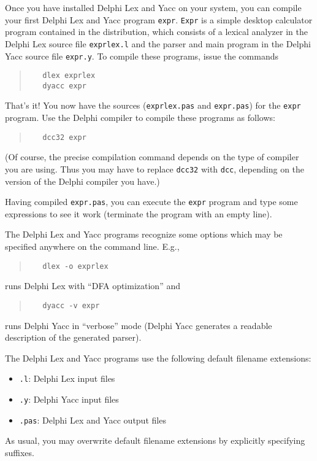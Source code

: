 \documentclass[a4paper]{article}
\begin{document}
Once you have installed Delphi Lex and Yacc on your system, you can compile your
first Delphi Lex and Yacc program \verb"expr". \verb"Expr" is a simple desktop
calculator program contained in the distribution, which consists of a lexical
analyzer in the Delphi Lex source file \verb"exprlex.l" and the parser and main
program in the Delphi Yacc source file \verb"expr.y". To compile these programs,
issue the commands
\begin{quote}\begin{verbatim}
   dlex exprlex
   dyacc expr
\end{verbatim}\end{quote}
That's it! You now have the sources (\verb"exprlex.pas" and
\verb"expr.pas") for the \verb"expr" program. Use the Delphi
compiler to compile these programs as follows:
\begin{quote}\begin{verbatim}
   dcc32 expr
\end{verbatim}\end{quote}

(Of course, the precise compilation command depends on the type of compiler
you are using. Thus you may have to replace \verb"dcc32" with \verb"dcc", depending on the version of the Delphi compiler you have.)

Having compiled \verb"expr.pas", you can execute the \verb"expr" program and
type some expressions to see it work (terminate the program with an empty
line).

The Delphi Lex and Yacc programs recognize some options which may be specified
anywhere on the command line. E.g.,
\begin{quote}\begin{verbatim}
   dlex -o exprlex
\end{verbatim}\end{quote}
runs Delphi Lex with ``DFA optimization'' and
\begin{quote}\begin{verbatim}
   dyacc -v expr
\end{verbatim}\end{quote}
runs Delphi Yacc in ``verbose'' mode (Delphi Yacc generates a readable description
of the generated parser).

The Delphi Lex and Yacc programs use the following default filename extensions:
\begin{itemize}
   \item \verb".l": Delphi Lex input files
   \item \verb".y": Delphi Yacc input files
   \item \verb".pas": Delphi Lex and Yacc output files
\end{itemize}
As usual, you may overwrite default filename extensions by explicitly
specifying suffixes.
\end{document}
